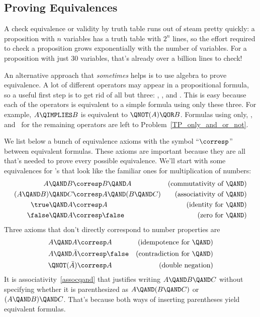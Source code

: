 \subsection{Proving Equivalences}\label{propositional_equivalences_sec}
A check equivalence%
or validity by truth table runs out of steam
pretty quickly: a proposition with $n$ variables has a truth table
with $2^n$ lines, so the effort required to check a proposition
grows exponentially with the number of variables.  For a
proposition with just 30 variables, that's already over a billion
lines to check!

An alternative approach that \emph{sometimes} helps is to use algebra
to prove equivalence.  A lot of different operators may appear in a
propositional formula, so a useful first step is to get rid of all but
three: \QAND, \QOR, and \QNOT.  This is easy because each of the
operators is equivalent to a simple formula using only these three.
For example, $A \QIMPLIES B$ is equivalent to $\QNOT(A) \QOR B$.
Formulas using only\QAND, \QOR, and \QNOT\ for the remaining operators
are left to Problem~\ref{TP_only_and_or_not}.


We list below a bunch of equivalence axioms%
%
with the symbol ``$\corresp$'' between equivalent formulas.  These axioms are
important because they are all that's needed to prove every possible
equivalence.  We'll start with some equivalences for \QAND's that look
like the familiar ones for multiplication of numbers:
\begin{align}
A \QAND B           &\corresp B \QAND A
         & \text{(commutativity of \QAND)}\label{commutqand}\\
(A \QAND B)\QAND C  & \corresp A \QAND (B \QAND C)
         & \text{(associativity of \QAND)}\label{assocqand}\\
\true \QAND A           &\corresp A
         & \text{(identity for \QAND)}\notag\\
\false \QAND A           &\corresp \false
         & \text{(zero for \QAND)}\notag
\end{align}
Three axioms that don't directly correspond to number properties are
\begin{align}
A \QAND A       &\corresp A
         & \text{(idempotence for \QAND)}\notag\\
A \QAND \bar{A} & \corresp \false
         & \text{(contradiction for \QAND)}\label{QAND-contra}\\
\QNOT(\bar{A})  & \corresp A
         & \text{(double negation)}\label{double-neg}
\end{align}
It is associativity~\eqref{assocqand} that justifies writing $A \QAND
B \QAND C$ without specifying whether it is parenthesized as $A \QAND
(B \QAND C)$ or $(A \QAND B) \QAND C$.  That's because both ways of
inserting parentheses yield equivalent formulas.

